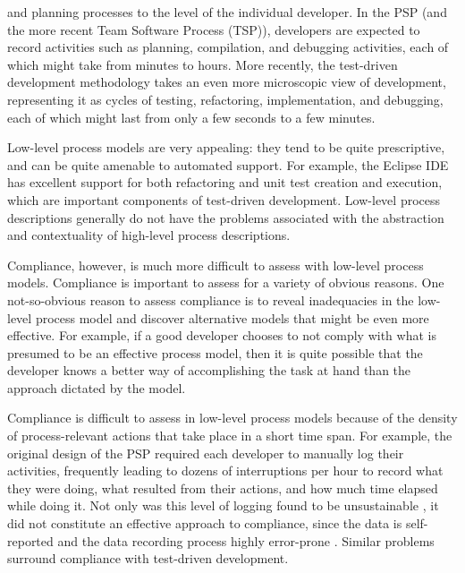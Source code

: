 and planning processes to the level of the individual developer.  In the
PSP (and the more recent Team Software Process (TSP)), developers are
expected to record activities such as planning, compilation, and debugging
activities, each of which might take from minutes to hours.  More recently,
the test-driven development methodology \cite{Beck:03} takes an even more
microscopic view of development, representing it as cycles of testing,
refactoring, implementation, and debugging, each of which might last from
only a few seconds to a few minutes.

Low-level process models are very appealing: they tend to be quite
prescriptive, and can be quite amenable to automated support. For example,
the Eclipse IDE has excellent support for both refactoring and unit test
creation and execution, which are important components of test-driven
development. Low-level process descriptions generally do not have the problems
associated with the abstraction and contextuality of high-level process
descriptions.

Compliance, however, is much more difficult to assess with low-level
process models.  Compliance is important to assess for a variety of obvious
reasons. One not-so-obvious reason to assess compliance is to reveal
inadequacies in the low-level process model and discover alternative models
that might be even more effective.  For example, if a good developer
chooses to not comply with what is presumed to be an effective process
model, then it is quite possible that the developer knows a better way of
accomplishing the task at hand than the approach dictated by the model.

Compliance is difficult to assess in low-level process models because of
the density of process-relevant actions that take place in a short time
span.  For example, the original design of the PSP required each developer
to manually log their activities, frequently leading to dozens of
interruptions per hour to record what they were doing, what resulted from
their actions, and how much time elapsed while doing it.  Not only was this
level of logging found to be unsustainable \cite{Ferguson97}, it did not
constitute an effective approach to compliance, since the data is
self-reported and the data recording process highly error-prone
\cite{csdl-98-13}.  Similar problems surround compliance with test-driven
development.

